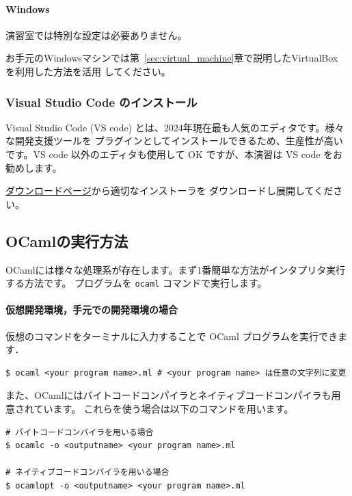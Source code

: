 \documentclass[a4paper,11pt]{jsarticle}
\begin{document}
\paragraph{Windows}

演習室では特別な設定は必要ありません。

お手元のWindowsマシンでは第~\ref{sec:virtual_machine}章で説明したVirtualBox を利用した方法を活用
してください。

\subsubsection{Visual Studio Code のインストール}

Visual Studio Code (VS code) とは、2024年現在最も人気のエディタです。様々な開発支援ツールを
プラグインとしてインストールできるため、生産性が高いです。VS code 以外のエディタも使用して
OK ですが、本演習は VS code をお勧めします。

\href{https://code.visualstudio.com/download}{ダウンロードページ}から適切なインストーラを
ダウンロードし展開してください。

\subsection{OCamlの実行方法}

OCamlには様々な処理系が存在します。まず1番簡単な方法がインタプリタ実行する方法です。
プログラムを \verb|ocaml| コマンドで実行します。

\paragraph*{仮想開発環境，手元での開発環境の場合}

仮想のコマンドをターミナルに入力することで OCaml プログラムを実行できます．

\begin{lstlisting}
$ ocaml <your program name>.ml # <your program name> は任意の文字列に変更
\end{lstlisting}

また、OCamlにはバイトコードコンパイラとネイティブコードコンパイラも用意されています。
これらを使う場合は以下のコマンドを用います。

\begin{lstlisting}
# バイトコードコンパイラを用いる場合
$ ocamlc -o <outputname> <your program name>.ml

# ネイティブコードコンパイラを用いる場合
$ ocamlopt -o <outputname> <your program name>.ml
\end{lstlisting}
\end{document}
